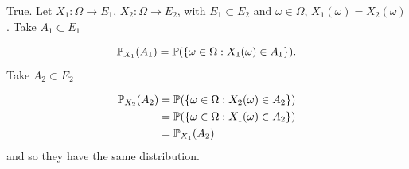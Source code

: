 

True. Let $ X_1: \Omega \to E_1$, $ X_2: \Omega \to E_2$, with $ E_1 \subset E_2$ and
$ \omega \in \Omega$, $ X_1 (\omega) = X_2 (\omega)$.
Take $ A_1 \subset E_1$

\[
    \P_{X_1} (A_1) = \P( \{ \omega \in \Omega: X_1(\omega) \in A_1 \} ) 
.\] 
Take $ A_2 \subset E_{2} $

\begin{align*}
    \P_{X_2} (A_2) &= \P ( \{ \omega \in \Omega: X_{2} (\omega)  \in A_2 \} ) \\
		   &= \P ( \{ \omega \in \Omega: X_1(\omega) \in A_2 \} )\\
		 &= \P_{X_1} (A_2)
\end{align*}
and so they have the same distribution.
